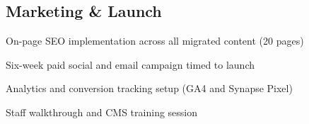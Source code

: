 \subsection{Marketing \& Launch}
\begin{checklist}
  \item On-page SEO implementation across all migrated content (20 pages)
  \item Six-week paid social and email campaign timed to launch
  \item Analytics and conversion tracking setup (GA4 and Synapse Pixel)
  \item Staff walkthrough and CMS training session
\end{checklist}

\clearpage

